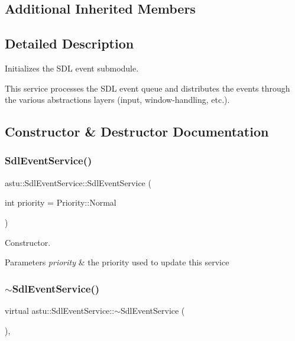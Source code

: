 \subsection*{Additional Inherited Members}


\subsection{Detailed Description}
Initializes the S\+DL event submodule.

This service processes the S\+DL event queue and distributes the events through the various abstractions layers (input, window-\/handling, etc.). 

\subsection{Constructor \& Destructor Documentation}
\mbox{\label{classastu_1_1SdlEventService_a09280da649db883caffdb148791864e0}} 
\subsubsection{\texorpdfstring{Sdl\+Event\+Service()}{SdlEventService()}}
{\footnotesize\ttfamily astu\+::\+Sdl\+Event\+Service\+::\+Sdl\+Event\+Service (\begin{DoxyParamCaption}\item[{int}]{priority = {\ttfamily Priority\+:\+:Normal} }\end{DoxyParamCaption})}

Constructor.


\begin{DoxyParams}{Parameters}
{\em priority} & the priority used to update this service \\
\hline
\end{DoxyParams}
\mbox{\label{classastu_1_1SdlEventService_aeaf9a60c44bec12daed28882a5c2fe3f}} 
\subsubsection{\texorpdfstring{$\sim$\+Sdl\+Event\+Service()}{~SdlEventService()}}
{\footnotesize\ttfamily virtual astu\+::\+Sdl\+Event\+Service\+::$\sim$\+Sdl\+Event\+Service (\begin{DoxyParamCaption}{ }\end{DoxyParamCaption})\hspace{0.3cm}{\ttfamily [inline]}, {\ttfamily [virtual]}}

